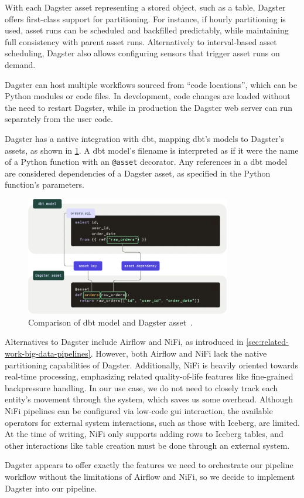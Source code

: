 With each Dagster asset representing a stored object, such as a table, Dagster offers first-class support for partitioning.
For instance, if hourly partitioning is used, asset runs can be scheduled and backfilled predictably, while maintaining full consistency with parent asset runs.
Alternatively to interval-based asset scheduling, Dagster also allows configuring sensors that trigger asset runs on demand.

Dagster can host multiple workflows sourced from ``code locations'', which can be Python modules or code files.
In development, code changes are loaded without the need to restart Dagster, while in production the Dagster web server can run separately from the user code.

Dagster has a native integration with dbt, mapping dbt's models to Dagster's assets, as shown in \cref{fig:design-decisions-orchestration-dbt}.
A dbt model's filename is interpreted as if it were the name of a Python function with an \texttt{@asset} decorator.
Any references in a dbt model are considered dependencies of a Dagster asset, as specified in the Python function's parameters.

\begin{figure}[H]
    \centering
    \includegraphics[width=0.8\textwidth]{figures/dagster-dbt.png}
    \caption{Comparison of dbt model and Dagster asset~\cite{DeMaria2022}.}
    \label{fig:design-decisions-orchestration-dbt}
\end{figure}

Alternatives to Dagster include Airflow and NiFi, as introduced in \cref{sec:related-work-big-data-pipelines}.
However, both Airflow and NiFi lack the native partitioning capabilities of Dagster.
Additionally, NiFi is heavily oriented towards real-time processing, emphasizing related quality-of-life features like fine-grained backpressure handling.
In our use case, we do not need to closely track each entity's movement through the system, which saves us some overhead.
Although NiFi pipelines can be configured via low-code \ac{gui} interaction, the available operators for external system interactions, such as those with Iceberg, are limited.
At the time of writing, NiFi only supports adding rows to Iceberg tables, and other interactions like table creation must be done through an external system.

Dagster appears to offer exactly the features we need to orchestrate our pipeline workflow without the limitations of Airflow and NiFi, so we decide to implement Dagster into our pipeline.
